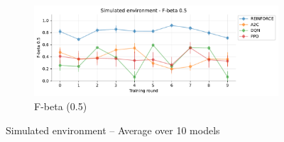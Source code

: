 \documentclass[a4paper, 12pt]{article}
\begin{document}
\begin{figure}[ht]
	\begin{subfigure}{\textwidth}
		\centering
		\includegraphics[width=\linewidth]{Simulated_F05.pdf}  
		\caption{F-beta (0.5)}
		\label{fig:tr-sim-f05}
	\end{subfigure}
	\caption{Simulated environment -- Average over 10 models}
	\label{fig:tr-sim-env}
\end{figure}
\end{document}

